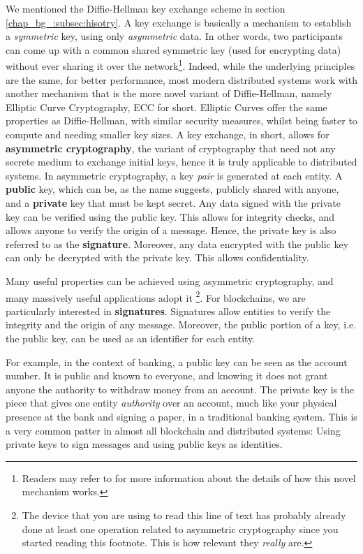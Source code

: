 We mentioned the Diffie-Hellman key exchange scheme in section \ref{chap_bg_:subsec:hisotry}. A key
exchange is basically a mechanism to establish a \textit{symmetric} key, using only
\textit{asymmetric} data. In other words, two participants can come up with a common shared
symmetric key (used for encrypting data) without ever sharing it over the network\footnote{Readers
may refer to \cite{Diffie_Hellman_1976} for more information about the details of how this novel
mechanism works.}. Indeed, while the underlying principles are the same, for better performance,
most modern distributed systems work with another mechanism that is the more novel variant of
Diffie-Hellman, namely Elliptic Curve Cryptography, ECC for short. Elliptic Curves offer the same
properties as Diffie-Hellman, with similar security measures, whilst being faster to compute and
needing smaller key sizes. A key exchange, in short, allows for \textbf{asymmetric cryptography},
the variant of cryptography that need not any secrete medium to exchange initial keys, hence it is
truly applicable to distributed systems. In asymmetric cryptography, a key \textit{pair} is
generated at each entity. A \textbf{public} key, which can be, as the name suggests, publicly shared
with anyone, and a \textbf{private} key that must be kept secret. Any data signed with the private
key can be verified using the public key. This allows for integrity checks, and allows anyone to
verify the origin of a message. Hence, the private key is also referred to as the
\textbf{signature}. Moreover, any data encrypted with the public key can only be decrypted with the
private key. This allows confidentiality.

Many useful properties can be achieved using asymmetric cryptography, and many massively useful
applications adopt it \footnote{The device that you are using to read this line of text has probably
already done at least one operation related to asymmetric cryptography since you started reading
this footnote. This is how relevant they \textit{really} are.}. For blockchains, we are particularly
interested in \textbf{signatures}. Signatures allow entities to verify the integrity and the origin
of any message. Moreover, the public portion of a key, i.e. the public key, can be used as an
identifier for each entity.

For example, in the context of banking, a public key can be seen as the account number. It is public
and known to everyone, and knowing it does not grant anyone the authority to withdraw money from an
account. The private key is the piece that gives one entity \textit{authority} over an account, much
like your physical presence at the bank and signing a paper, in a traditional banking system. This
is a very common patter in almost all blockchain and distributed systems: Using private keys to sign
messages and using public keys as identities.

